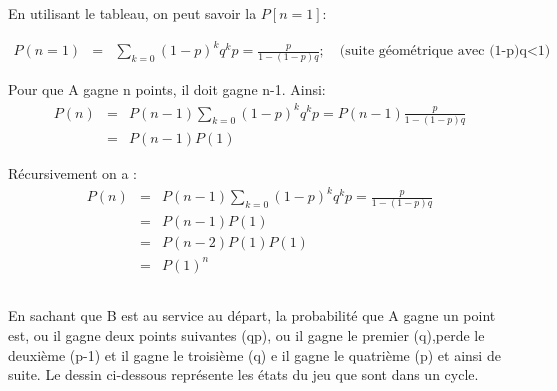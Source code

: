 \documentclass[a4paper]{article}
\begin{document}
En utilisant le tableau, on peut savoir la $P[n=1]$:

\begin{eqnarray*}
  P(n=1)  &  =  &  \sum_{k=0}(1-p)^kq^kp= \frac{p}{1-(1-p)q}  ;\quad  \text{(suite
    géométrique avec (1-p)q<1) }
\end{eqnarray*}

Pour que A gagne n points, il doit gagne n-1. Ainsi:
\begin{eqnarray*}
  P(n) & = &P(n-1)\sum_{k=0}(1-p)^kq^kp= P(n-1)\frac{p}{1-(1-p)q}\\
  & = &P(n-1)P(1)
\end{eqnarray*}

Récursivement on a :
\begin{eqnarray*}
  P(n) & = &P(n-1)\sum_{k=0}(1-p)^kq^kp= \frac{p}{1-(1-p)q}\\
  & = &P(n-1)P(1)\\
  & = &P(n-2)P(1)P(1)\\
  & = &P(1)^n
\end{eqnarray*}

\subsection{}

En sachant que B  est au service au départ, la probabilité  que A gagne un point
est, ou il gagne deux points suivantes (qp), ou il gagne le premier (q),perde le
deuxième (p-1) et il gagne le
troisième (q) e il gagne le quatrième (p) et ainsi de suite. Le dessin ci-dessous
représente les états du jeu que sont dans un cycle.

\end{document}
